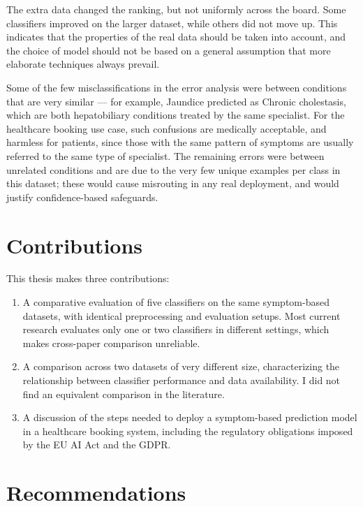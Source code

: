 The extra data changed the ranking, but not uniformly across the board. Some classifiers improved on the larger dataset, while others did not move up. This indicates that the properties of the real data should be taken into account, and the choice of model should not be based on a general assumption that more elaborate techniques always prevail.

Some of the few misclassifications in the error analysis were between conditions that are very similar --- for example, Jaundice predicted as Chronic cholestasis, which are both hepatobiliary conditions treated by the same specialist. For the healthcare booking use case, such confusions are medically acceptable, and harmless for patients, since those with the same pattern of symptoms are usually referred to the same type of specialist. The remaining errors were between unrelated conditions and are due to the very few unique examples per class in this dataset; these would cause misrouting in any real deployment, and would justify confidence-based safeguards.

\section{Contributions}
\label{sec:contributions}

This thesis makes three contributions:

\begin{enumerate}
    \item A comparative evaluation of five classifiers on the same symptom-based datasets, with identical preprocessing and evaluation setups. Most current research evaluates only one or two classifiers in different settings, which makes cross-paper comparison unreliable.
    \item A comparison across two datasets of very different size, characterizing the relationship between classifier performance and data availability. I did not find an equivalent comparison in the literature.
    \item A discussion of the steps needed to deploy a symptom-based prediction model in a healthcare booking system, including the regulatory obligations imposed by the EU AI Act and the GDPR.
\end{enumerate}

\section{Recommendations}
\label{sec:recommendations}

